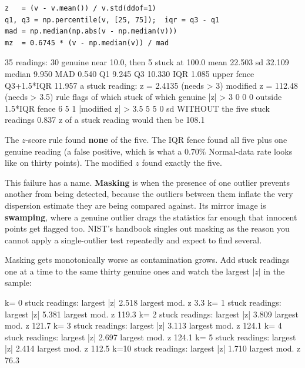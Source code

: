 \documentclass[11pt]{article}
\begin{document}
\begin{lstlisting}
z   = (v - v.mean()) / v.std(ddof=1)
q1, q3 = np.percentile(v, [25, 75]);  iqr = q3 - q1
mad = np.median(np.abs(v - np.median(v)))
mz  = 0.6745 * (v - np.median(v)) / mad
\end{lstlisting}
\begin{codeout}
35 readings: 30 genuine near 10.0, then 5 stuck at 100.0
  mean 22.503   sd 32.109   median 9.950   MAD 0.540
  Q1 9.245  Q3 10.330  IQR 1.085  upper fence Q3+1.5*IQR 11.957
  a stuck reading:  z = 2.4135  (needs > 3)   modified z = 112.48  (needs > 3.5)
rule                     flags   of which stuck   of which genuine
  |z| > 3                  0          0               0
  outside 1.5*IQR fence    6          5               1
  |modified z| > 3.5       5          5               0
sd WITHOUT the five stuck readings  0.837
z of a stuck reading would then be  108.1
\end{codeout}

The $z$-score rule found \textbf{none} of the five. The IQR fence found all
five plus one genuine reading (a false positive, which is what a $0.70\%$
Normal-data rate looks like on thirty points). The modified $z$ found exactly
the five.

\begin{caution}[Masking]
This failure has a name. \textbf{Masking} is when the presence of one outlier
prevents another from being detected, because the outliers between them
inflate the very dispersion estimate they are being compared against. Its
mirror image is \textbf{swamping}, where a genuine outlier drags the statistics
far enough that innocent points get flagged too. NIST's handbook singles out
masking as the reason you cannot apply a single-outlier test repeatedly and
expect to find several.
\end{caution}

Masking gets monotonically worse as contamination grows. Add stuck readings one
at a time to the same thirty genuine ones and watch the largest $|z|$ in the
sample:

\begin{codeout}
    k= 0 stuck readings: largest |z|  2.518   largest mod. z     3.3
    k= 1 stuck readings: largest |z|  5.381   largest mod. z   119.3
    k= 2 stuck readings: largest |z|  3.809   largest mod. z   121.7
    k= 3 stuck readings: largest |z|  3.113   largest mod. z   124.1
    k= 4 stuck readings: largest |z|  2.697   largest mod. z   124.1
    k= 5 stuck readings: largest |z|  2.414   largest mod. z   112.5
    k=10 stuck readings: largest |z|  1.710   largest mod. z    76.3
\end{codeout}
\end{document}

